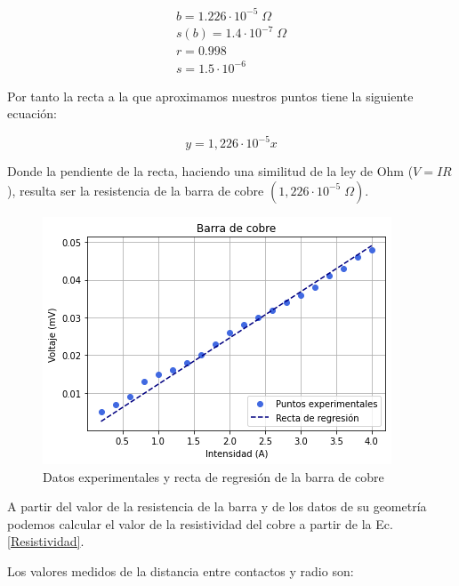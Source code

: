 \documentclass[a4paper,12pt,titlepage]{report}
\begin{document}
\begin{equation}
    \begin{gathered}
        b = 1.226 \cdot 10^{-5}\; \Omega
        \\
        s(b) = 1.4 \cdot 10^{-7}\; \Omega
        \\
        r = 0.998
        \\
        s = 1.5 \cdot 10^{-6}
    \end{gathered}
\end{equation}

Por tanto la recta a la que aproximamos nuestros puntos tiene la siguiente ecuación:

\begin{equation}
    y = 1,226 \cdot 10^{-5}x
\end{equation}

Donde la pendiente de la recta, haciendo una similitud de la ley de Ohm ($V=IR$), resulta ser la resistencia de la barra de cobre $(1,226 \cdot 10^{-5}\;  \Omega)$.

\begin{figure}[h!]
    \centering
    \includegraphics[width=0.85\linewidth]{Images/plotCobre.png}
    \caption{Datos experimentales y recta de regresión de la barra de cobre}
\end{figure}

\newpage

\par A partir del valor de la resistencia de la barra y de los datos de su geometría podemos calcular el valor de la resistividad del cobre a partir de la Ec.\ref{Resistividad}.

\par Los valores medidos de la distancia entre contactos y radio son:
\end{document}
